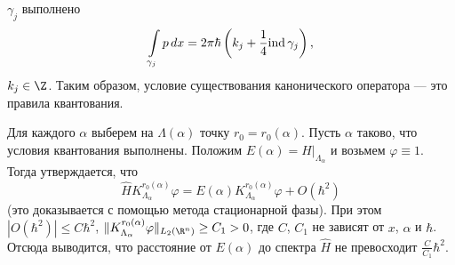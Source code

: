 \documentclass[a4paper
]{article}
\begin{document}
$\gamma _j$ выполнено $$\int \limits _{\gamma _j} p\, dx=2\pi \hbar \left(k_j+\frac14
{\rm ind}\, \gamma _j\right),$$ $k_j \in \Z$. Таким образом, условие существования
канонического оператора --- это правила квантования. \par
Для каждого $\alpha$ выберем на $\Lambda(\alpha)$ точку $r_0=r_0(\alpha)$.
Пусть $\alpha$ таково, что условия квантования выполнены. Положим $E(\alpha)=
H|_{\Lambda_\alpha}$ и возьмем $\varphi \equiv 1$. Тогда утверждается, что $$\hat H
K^{r_0(\alpha)}_{\Lambda _\alpha}\varphi = E(\alpha)K^{r_0(\alpha)}_{\Lambda _\alpha}\varphi
+O(\hbar ^2)$$ (это доказывается с помощью метода стационарной фазы). При этом
$|O(\hbar ^2)|\le C\hbar ^2$, $\|K^{r_0(\alpha)}_{\Lambda _\alpha}\varphi\|
_{L_2(\R^n)}\ge C_1>0$, где $C$, $C_1$ не зависят от $x$, $\alpha$ и $\hbar$. Отсюда
выводится, что расстояние от $E(\alpha)$ до спектра $\hat H$ не превосходит
$\frac{C}{C_1}\hbar^2$.
\end{document}
